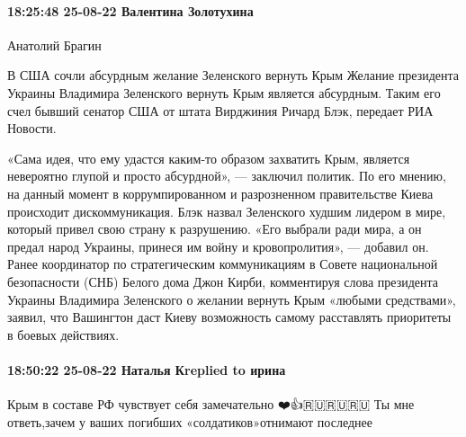  
 
 
 
 

\paragraph{18:25:48 25-08-22 Валентина Золотухина}

Анатолий Брагин

В США сочли абсурдным желание Зеленского вернуть Крым
Желание
президента Украины Владимира Зеленского вернуть Крым является
абсурдным. Таким его счел бывший сенатор США от штата Вирджиния Ричард
Блэк, передает РИА Новости. 

«Сама идея, что ему удастся каким-то образом захватить Крым, является невероятно глупой и просто абсурдной», — заключил политик.
По его мнению, на данный момент в коррумпированном и разрозненном правительстве Киева происходит дискоммуникация.
Блэк назвал Зеленского худшим лидером в мире, который привел свою страну к разрушению.
«Его выбрали ради мира, а он предал народ Украины, принеся им войну и кровопролития», — добавил он.
Ранее
координатор по стратегическим коммуникациям в Совете национальной
безопасности (СНБ) Белого дома Джон Кирби, комментируя слова президента
Украины Владимира Зеленского о желании вернуть Крым «любыми средствами»,
заявил, что Вашингтон даст Киеву возможность самому расставлять
приоритеты в боевых действиях.

\paragraph{18:50:22 25-08-22 Наталья Кreplied to ирина}

Крым в составе РФ чувствует себя замечательно ❤️👍🇷🇺🇷🇺🇷🇺
Ты мне ответь,зачем у ваших погибших «солдатиков»отнимают последнее



